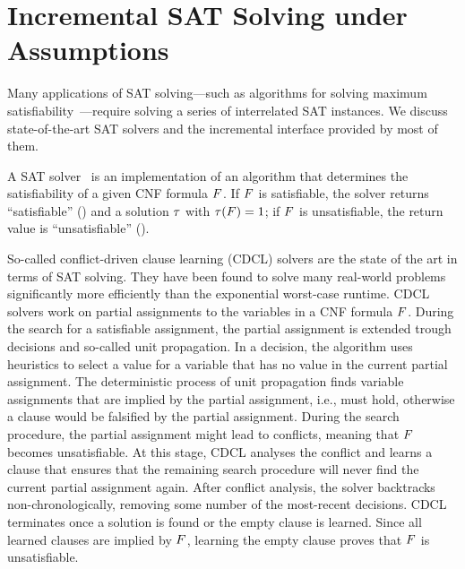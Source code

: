 \section{Incremental SAT Solving under Assumptions\label{sec:inc-sat}}

Many applications of SAT solving---such as algorithms for solving maximum satisfiability~\autocite{handbook2-maxsat}---require solving a series of interrelated SAT instances.
We discuss state-of-the-art SAT solvers and the incremental interface provided by most of them.

A SAT solver~\autocite{handbook2-cdcl} is an implementation of an algorithm that determines the satisfiability of a given CNF formula $F$.
If $F$ is satisfiable, the solver returns ``satisfiable'' (\sat{}) and a solution $\tau$ with $\tau(F)=1$;
if $F$ is unsatisfiable, the return value is ``unsatisfiable'' (\unsat{}).

So-called conflict-driven clause learning (CDCL) solvers are the state of the art in terms of SAT solving.
They have been found to solve many real-world problems significantly more efficiently than the exponential worst-case runtime.
CDCL solvers work on partial assignments to the variables in a CNF formula $F$.
During the search for a satisfiable assignment, the partial assignment is extended trough decisions and so-called unit propagation.
In a decision, the algorithm uses heuristics to select a value for a variable that has no value in the current partial assignment.
The deterministic process of unit propagation finds variable assignments that are implied by the partial assignment, i.e., must hold, otherwise a clause would be falsified by the partial assignment.
During the search procedure, the partial assignment might lead to conflicts, meaning that $F$ becomes unsatisfiable.
At this stage, CDCL analyses the conflict and learns a clause that ensures that the remaining search procedure will never find the current partial assignment again.
After conflict analysis, the solver backtracks non-chronologically, removing some number of the most-recent decisions.
CDCL terminates once a solution is found or the empty clause is learned.
Since all learned clauses are implied by $F$, learning the empty clause proves that $F$ is unsatisfiable.

